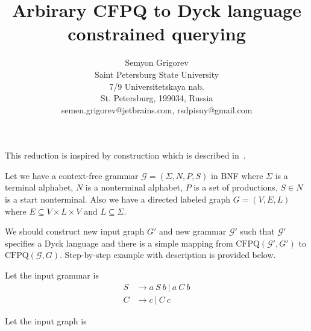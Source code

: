 \documentclass[12pt]{article}  %
\title{Arbirary CFPQ to Dyck language constrained querying}
\author{Semyon Grigorev
\\
       {Saint Petersburg State University}\\
       {7/9 Universitetskaya nab.}\\
       {St. Petersburg, 199034, Russia}\\
       semen.grigorev@jetbrains.com, rsdpisuy@gmail.com
       }
\date{}
\theoremstyle{definition}
\theoremstyle{remark}
\begin{document}
\maketitle

This reduction is inspired by construction which is described in~\cite{OptimalDLR}.

Let we have a context-free grammar $\mathcal{G}=(\Sigma, N, P, S)$ in BNF where $\Sigma$ is a terminal alphabet, $N$ is 
a nonterminal alphabet, $P$ is a set of productions, $S \in N$ is a start nonterminal.
Also we have a directed labeled graph $G=(V,E,L)$ where $E \subseteq V \times L \times V$ and $L \subseteq \Sigma$. 

We should construct new input graph $G'$ and new grammar $\mathcal{G'}$ such that $\mathcal{G'}$ specifies a Dyck language and there is a simple mapping from $\text{CFPQ}(\mathcal{G'}, G')$ to $\text{CFPQ}(\mathcal{G}, G)$.
Step-by-step example with description is provided below.
 
Let the input grammar is 
\begin{align*}
S & \rightarrow a \ S \ b \ | \ a \ C \ b 
\\
C & \rightarrow c \ | \ C \ c
\end{align*}

Let the input graph is
\\
\end{document}
